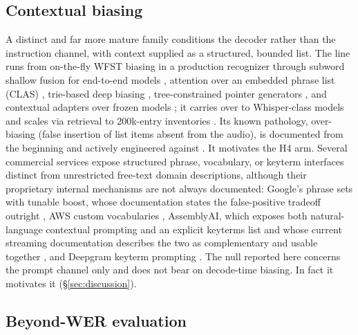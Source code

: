 \documentclass[11pt]{article}
\begin{document}
\subsection{Contextual biasing}

A distinct and far more mature family conditions the decoder rather than the instruction channel, with context supplied as a structured, bounded list. The line runs from on-the-fly WFST biasing in a production recognizer \citep{aleksic15} through subword shallow fusion for end-to-end models \citep{zhao19}, attention over an embedded phrase list (CLAS) \citep{pundak18}, trie-based deep biasing \citep{le21}, tree-constrained pointer generators \citep{sun21}, and contextual adapters over frozen models \citep{sathyendra22}; it carries over to Whisper-class models \citep{sun23} and scales via retrieval to 200k-entry inventories \citep{gong25}. Its known pathology, over-biasing (false insertion of list items absent from the audio), is documented from the beginning and actively engineered against \citep{alon19,zhao19}. It motivates the H4 arm. Several commercial services expose structured phrase, vocabulary, or keyterm interfaces distinct from unrestricted free-text domain descriptions, although their proprietary internal mechanisms are not always documented: Google's phrase sets with tunable boost, whose documentation states the false-positive tradeoff outright \citep{googlecloud26}, AWS custom vocabularies \citep{aws26}, AssemblyAI, which exposes both natural-language contextual prompting and an explicit keyterms list and whose current streaming documentation describes the two as complementary and usable together \citep{assemblyai26}, and Deepgram keyterm prompting \citep{deepgram26}. The null reported here concerns the prompt channel only and does not bear on decode-time biasing. In fact it motivates it (\S\ref{sec:discussion}).

\subsection{Beyond-WER evaluation}
\end{document}
